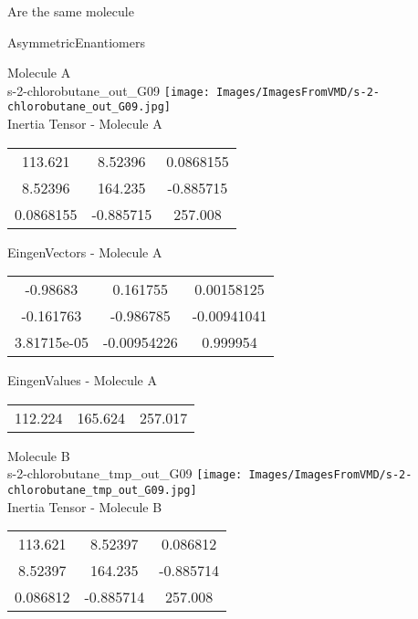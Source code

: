 \begin{center}
\vtab
\vtab
\textcolor{NavyBlue}{\Large Are the same molecule}
\end{center}
\newpage

\vtab[-2cm]
\begin{center}
{\large AsymmetricEnantiomers}
\end{center}
\begin{multicols}{2}
\begin{center}
Molecule A \\ 
s-2-chlorobutane\_out\_G09
\texttt{[image: Images/ImagesFromVMD/s-2-chlorobutane\_out\_G09.jpg]}
\\
Inertia Tensor - Molecule A \\
\vtab
\begin{tabular}{|c c c|}
113.621	 & 	8.52396	 & 	0.0868155	 \\
8.52396	 & 	164.235	 & 	-0.885715	 \\
0.0868155	 & 	-0.885715	 & 	257.008
\end{tabular}

\vtab
 EingenVectors - Molecule A     \\
\vtab
\begin{tabular}{|c c c|}
-0.98683	 & 	0.161755	 & 	0.00158125	 \\
-0.161763	 & 	-0.986785	 & 	-0.00941041	 \\
3.81715e-05	 & 	-0.00954226	 & 	0.999954
\end{tabular}

\vtab
 EingenValues - Molecule A     \\
\vtab
\begin{tabular}{|c c c|}
112.224	 & 	165.624	 & 	257.017
\end{tabular}
\columnbreak

Molecule B \\ 
s-2-chlorobutane\_tmp\_out\_G09
\texttt{[image: Images/ImagesFromVMD/s-2-chlorobutane\_tmp\_out\_G09.jpg]}
\\
Inertia Tensor - Molecule B \\
\vtab
\begin{tabular}{|c c c|}
113.621	 & 	8.52397	 & 	0.086812	 \\
8.52397	 & 	164.235	 & 	-0.885714	 \\
0.086812	 & 	-0.885714	 & 	257.008
\end{tabular}


\end{center}
\end{multicols}
